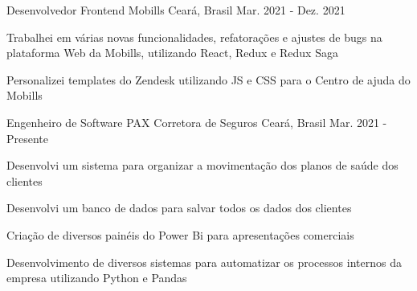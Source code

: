 \begin{cventries}
\cventry
{Desenvolvedor Frontend} %
{Mobills} %
{Ceará, Brasil} %
{Mar. 2021 - Dez. 2021} %
{
  \begin{cvitems} %
    \item {Trabalhei em várias novas
    funcionalidades, refatorações e
    ajustes de bugs na plataforma Web
    da Mobills, utilizando React,
    Redux e Redux Saga}
    \item {Personalizei templates do Zendesk
    utilizando JS e CSS para o Centro
    de ajuda do Mobills}
  \end{cvitems}
}

  \cventry
    {Engenheiro de Software} %
    {PAX Corretora de
    Seguros} %
    {Ceará, Brasil} %
    {Mar. 2021 - Presente} %
    {
      \begin{cvitems} %
        \item {Desenvolvi um sistema para organizar a movimentação dos planos de saúde dos clientes}
        \item {Desenvolvi um banco de dados
        para salvar todos os dados dos clientes}
        \item {Criação de diversos painéis do Power Bi para apresentações comerciais}
        \item {Desenvolvimento de diversos
        sistemas para automatizar os processos internos da empresa utilizando Python e Pandas}
      \end{cvitems}
    }

\end{cventries}
